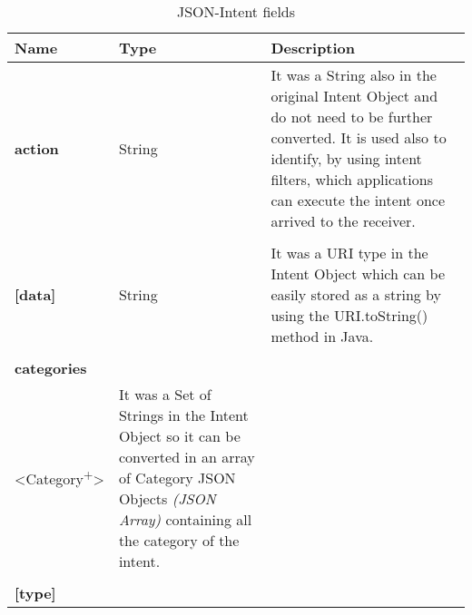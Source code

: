 \bigskip
\bigskip
\bigskip
\bigskip
\begin{table}[h]
	\caption{JSON-Intent fields}
	\label{tab:JSON-Intent}
	\centering
	\begin{center}
		
		\begin{tabular}{>{\centering\arraybackslash} m{}p{}p{}}
			
			\toprule
			\centering\textbf{Name} & \centering\textbf{Type}  &	\textbf{Description} \\
			\midrule
			\centering\textbf{action} & \begin{minipage}[t]{0.25\textwidth}
				\centering
				String
			\end{minipage} & \begin{minipage}[t]{0.55\textwidth}
				It was a String also in the original Intent Object and do not need to be further converted. It is used also to identify, by using intent filters, which applications can execute the intent once arrived to the receiver.
			\end{minipage}\\%
		&&\\
			\centering\textbf{[data]}\footnotemark[1] & \begin{minipage}[t]{0.25\textwidth}
				\centering
				String
			\end{minipage} & \begin{minipage}[t]{0.55\textwidth}
				It was a URI type in the Intent Object which can be easily stored as a string by using the URI.toString() method in Java.
			\end{minipage}\\%
		&&\\
			\centering\textbf{categories} & \begin{minipage}[t]{0.25\textwidth}
			\centering
			Array\\<Category\textsuperscript{+}> \footnotemark[2]\footnotemark[3]
		\end{minipage} & \begin{minipage}[t]{0.55\textwidth}
			It was a Set of Strings in the Intent Object so it can be converted in an array of Category JSON Objects \textit{(JSON Array)} containing all the category of the intent.
		\end{minipage}\\%
		&&\\
			\centering\textbf{[type]}\footnotemark[1] & \begin{minipage}[t]{0.25\textwidth}

\end{minipage}
\end{tabular}
\end{center}
\end{table}
